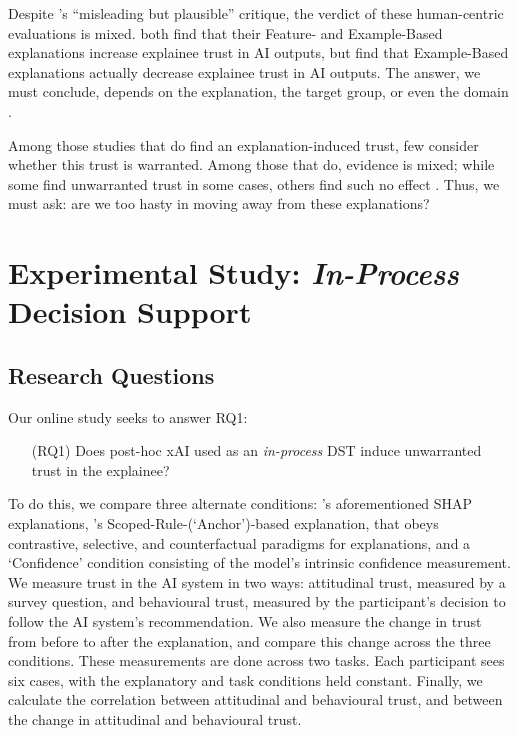 Despite \textcite{Lipton}'s ``misleading but plausible'' critique, the verdict of these human-centric evaluations is mixed. \textcite{Lai-and-Tan,Jacobs-et-al} both find that their Feature- and Example-Based explanations increase explainee trust in AI outputs, but \textcite{Binns-et-al} find that Example-Based explanations actually decrease explainee trust in AI outputs. The answer, we must conclude, depends on the explanation, the target group, or even the domain \cite{Mohseni-et-al}. 

Among those studies that do find an explanation-induced trust, few consider whether this trust is warranted. Among those that do, evidence is mixed; while some find unwarranted trust in some cases, others find such no effect \cite{Lai-and-Tan,Jacobs-et-al}. Thus, we must ask: are we too hasty in moving away from these explanations? 

\section{Experimental Study: \emph{In-Process} Decision Support}\label{sec:online}
\subsection{Research Questions}
Our online study seeks to answer RQ1:

\begin{enumerate}
    \item[(RQ1)] Does post-hoc xAI used as an \emph{in-process} DST induce unwarranted trust in the explainee?
\end{enumerate}

To do this, we compare three alternate conditions: \textcite{Lundberg-and-Lee}'s aforementioned SHAP explanations, \textcite{Ribeiro-et-al-anchors}'s Scoped-Rule-(`Anchor')-based explanation, that obeys contrastive, selective, and counterfactual paradigms for explanations, and a `Confidence' condition consisting of the model's intrinsic confidence measurement. We measure trust in the AI system in two ways: attitudinal trust, measured by a survey question, and behavioural trust, measured by the participant's decision to follow the AI system's recommendation. We also measure the change in trust from before to after the explanation, and compare this change across the three conditions. These measurements are done across two tasks. Each participant sees six cases, with the explanatory and task conditions held constant. Finally, we calculate the correlation between attitudinal and behavioural trust, and between the change in attitudinal and behavioural trust.

